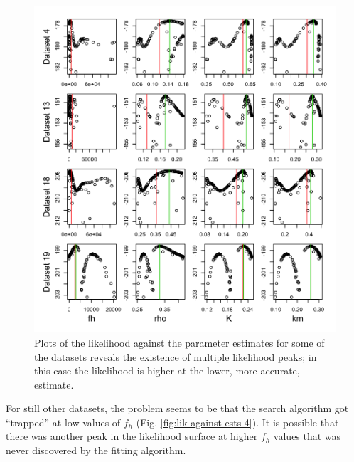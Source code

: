 \documentclass[12pt,reqno,final,pdftex]{amsart}\usepackage[]{graphicx}\usepackage[]{color}
\newenvironment{knitrout}{}{} %
\theoremstyle{plain}
\numberwithin{equation}{part}
\begin{document}
\begin{knitrout}\scriptsize
{}\color{fgcolor}\begin{figure}

\includegraphics[width=\linewidth]{figure/lik-against-ests-3-1} \hfill{}

\caption[Plots of the likelihood against the parameter estimates for some of the datasets reveals the existence of multiple likelihood peaks]{Plots of the likelihood against the parameter estimates for some of the datasets reveals the existence of multiple likelihood peaks; in this case the likelihood is higher at the lower, more accurate, estimate.}\label{fig:lik-against-ests-3}
\end{figure}


\end{knitrout}

For still other datasets, the problem seems to be that the search algorithm got ``trapped'' at low values of $f_h$ (Fig. \ref{fig:lik-against-ests-4}).
It is possible that there was another peak in the likelihood surface at higher $f_h$ values that was never discovered by the fitting algorithm.
\end{document}
